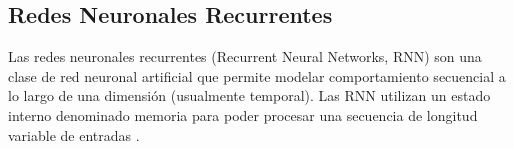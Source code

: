 \subsection{Redes Neuronales Recurrentes}

Las redes neuronales recurrentes (Recurrent Neural Networks, RNN) son una clase 
de red neuronal artificial que permite modelar comportamiento secuencial a lo 
largo de una dimensión (usualmente temporal). Las RNN utilizan un estado interno 
denominado memoria para poder procesar una secuencia de longitud variable de 
entradas \citep{Abiodun2018}.



